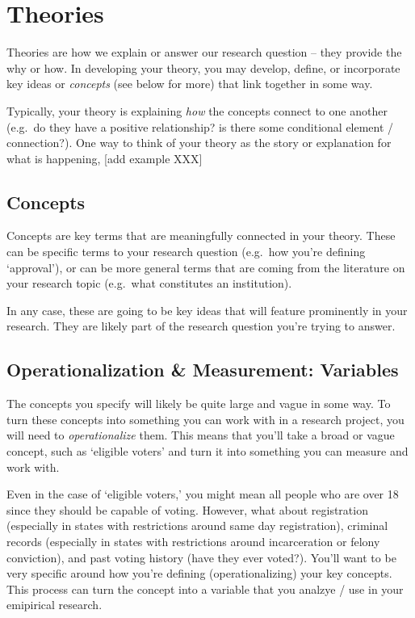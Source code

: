 \documentclass[
]{book}
\begin{document}
\hypertarget{theories}{%
\section{Theories}\label{theories}}

Theories are how we explain or answer our research question -- they provide the why or how. In developing your theory, you may develop, define, or incorporate key ideas or \emph{concepts} (see below for more) that link together in some way.

Typically, your theory is explaining \emph{how} the concepts connect to one another (e.g.~do they have a positive relationship? is there some conditional element / connection?). One way to think of your theory as the story or explanation for what is happening, {[}add example XXX{]}

\hypertarget{concepts}{%
\subsection{Concepts}\label{concepts}}

Concepts are key terms that are meaningfully connected in your theory. These can be specific terms to your research question (e.g.~how you're defining `approval'), or can be more general terms that are coming from the literature on your research topic (e.g.~what constitutes an institution).

In any case, these are going to be key ideas that will feature prominently in your research. They are likely part of the research question you're trying to answer.

\hypertarget{operationalization-measurement-variables}{%
\subsection{Operationalization \& Measurement: Variables}\label{operationalization-measurement-variables}}

The concepts you specify will likely be quite large and vague in some way. To turn these concepts into something you can work with in a research project, you will need to \emph{operationalize} them. This means that you'll take a broad or vague concept, such as `eligible voters' and turn it into something you can measure and work with.

Even in the case of `eligible voters,' you might mean all people who are over 18 since they should be capable of voting. However, what about registration (especially in states with restrictions around same day registration), criminal records (especially in states with restrictions around incarceration or felony conviction), and past voting history (have they ever voted?). You'll want to be very specific around how you're defining (operationalizing) your key concepts. This process can turn the concept into a variable that you analzye / use in your emipirical research.
\end{document}
